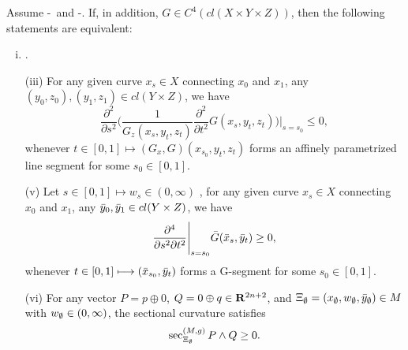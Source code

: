 \begin{theorem}\label{prop:4thorder2}
	Assume \Gzero-\Gtwo\ and \Gfour-\Geight. If, in addition, $G\in C^4(cl(X\times Y \times Z)
	)$,  then the following statements are equivalent:
	\begin{enumerate}[(i)]
		\item \Gthree.
				
		\item[(iii)] For any given curve $x_s\in X$ connecting $x_0$ and $x_1$,  any $(y_0, z_0),  (y_1, z_1) \in cl( Y \times Z) $, we have 
		\begin{equation}
		\frac{\partial^2}{\partial s^2 }\Biggl(\frac{1}{G_z(x_s, y_t, z_t)}\frac{\partial^2}{\partial t^2} G(x_s,y_t,z_t) \Biggr)\Bigg|_{s=s_0}\le 0,
		\end{equation}
		whenever $t\in [0,1] \longmapsto (G_x, G)(x_{s_0}, y_t, z_t)$  forms an affinely parametrized line segment for some $s_0\in [0,1]$.
		
	\item[(v)] Let $s\in [0,1] \longmapsto w_s \in (0, \infty)$
	, for any given curve $x_s\in X$ connecting $x_0$ and $x_1$, any $\bar{y}_0,  \bar{y}_1 \in cl( Y \times Z) $, we have 
	\begin{equation}\label{barG-4thorder}
	\frac{\partial^4}{\partial s^2 \partial t^2} \Bigg|_{s=s_0} \bar{G}(\bar{x}_s,\bar{y}_t)  \ge 0,
	\end{equation}
	whenever $t\in [0,1] \longmapsto (\bar{x}_{s_0}, \bar{y}_t)$  forms a G-segment for some $s_0\in [0,1]$.
	

	
	\item[(vi)] For any vector $P = p \oplus 0$, $Q = 0 \oplus q \in {\mathbf R}^{2n+2}$, and $\Xi_{{\emptyset}} = (x_{{\emptyset}}, w_{{\emptyset}}, \bar{y}_{{\emptyset}}) \in M$ with $w_{{\emptyset}} \in (0, \infty)$, the sectional curvature satisfies
		\begin{equation}\label{Curvature_sectional2}
		\sec_{\Xi_{{\emptyset}}}^{(M, g)} P \wedge Q \ge 0.
		\end{equation}
	\end{enumerate} 
\end{theorem}

